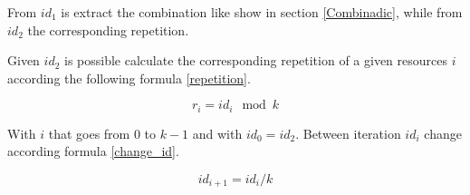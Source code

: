 From $id_1$ is extract the combination like show in section \ref{Combinadic}, while from $id_2$ the corresponding repetition.

Given $id_2$ is possible calculate the corresponding repetition of a given resources $i$ according 
the following formula \ref{repetition}.

\begin{equation}
    r_i = id_i\mod{k}
    \label{repetition}
\end{equation}

With $i$ that goes from 0 to $k-1$ and with $id_0 = id_2$. Between iteration $id_i$ change according formula \ref{change_id}.

\begin{equation}
    id_{i+1} = id_i/k
    \label{change_id}
\end{equation}